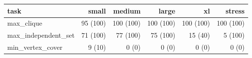 \begin{tabular}{lrrrrr}
\toprule
task & small & medium & large & xl & stress \\
\midrule
max\_clique & 95 (100) & 100 (100) & 100 (100) & 100 (100) & 100 (100) \\
max\_independent\_set & 71 (100) & 77 (100) & 75 (100) & 15 (40) & 5 (100) \\
min\_vertex\_cover & 9 (10) & 0 (0) & 0 (0) & 0 (0) & 0 (0) \\
\bottomrule
\end{tabular}
